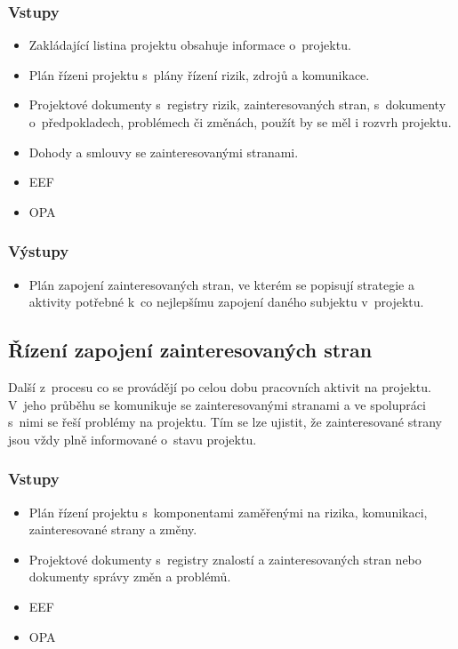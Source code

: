 \subsubsection*{Vstupy}
\begin{itemize}
    \item Zakládající listina projektu obsahuje informace o~projektu.
    \item Plán řízeni projektu s~plány řízení rizik, zdrojů a komunikace. 
    \item Projektové dokumenty s~registry rizik, zainteresovaných stran, s~dokumenty o~předpokladech, problémech či změnách, použít by se měl i rozvrh projektu.
    \item Dohody a smlouvy se zainteresovanými stranami.
    \item EEF
    \item OPA
\end{itemize}
\subsubsection*{Výstupy}
\begin{itemize}
    \item Plán zapojení zainteresovaných stran, ve kterém se popisují strategie a aktivity potřebné k~co nejlepšímu zapojení daného subjektu v~projektu.
\end{itemize}



\subsection*{Řízení zapojení zainteresovaných stran}

Další z~procesu co se provádějí po celou dobu pracovních aktivit na projektu. V~jeho průběhu se komunikuje se zainteresovanými stranami a ve spolupráci s~nimi se řeší problémy na projektu. Tím se lze ujistit, že zainteresované strany jsou vždy plně informované o~stavu projektu.

\subsubsection*{Vstupy}
\begin{itemize}
    \item Plán řízení projektu s~komponentami zaměřenými na rizika, komunikaci, zainteresované strany a změny.
    \item Projektové dokumenty s~registry znalostí a zainteresovaných stran nebo dokumenty správy změn a problémů.
    \item EEF
    \item OPA
\end{itemize}
